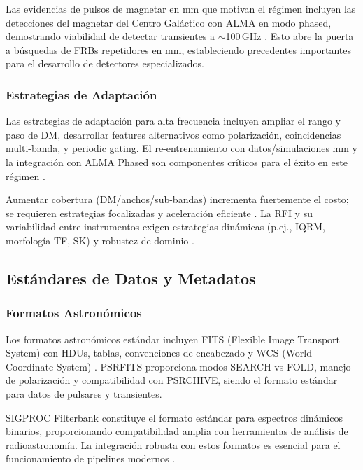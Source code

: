 Las evidencias de pulsos de magnetar en mm que motivan el régimen incluyen las detecciones del magnetar del Centro Galáctico con ALMA en modo phased, demostrando viabilidad de detectar transientes a $\sim$100\,GHz \citep{veracasanova2025}. Esto abre la puerta a búsquedas de FRBs repetidores en mm, estableciendo precedentes importantes para el desarrollo de detectores especializados.

\subsubsection{Estrategias de Adaptación}

Las estrategias de adaptación para alta frecuencia incluyen ampliar el rango y paso de DM, desarrollar features alternativos como polarización, coincidencias multi-banda, y periodic gating. El re-entrenamiento con datos/simulaciones mm y la integración con ALMA Phased son componentes críticos para el éxito en este régimen \citep{veracasanova2025}.

Aumentar cobertura (DM/anchos/sub-bandas) incrementa fuertemente el costo; se requieren estrategias focalizadas y aceleración eficiente \citep{zhang2024drafts,Zackay_2014_FDMT}. La RFI y su variabilidad entre instrumentos exigen estrategias dinámicas (p.ej., IQRM, morfología TF, SK) y robustez de dominio \citep{Morello_2021_IQRM,Offringa2010,Offringa2012}.

\subsection{Estándares de Datos y Metadatos}

\subsubsection{Formatos Astronómicos}

Los formatos astronómicos estándar incluyen FITS (Flexible Image Transport System) con HDUs, tablas, convenciones de encabezado y WCS (World Coordinate System) \citep{Hotan_2004_PSRFITS}. PSRFITS proporciona modos SEARCH vs FOLD, manejo de polarización y compatibilidad con PSRCHIVE, siendo el formato estándar para datos de pulsares y transientes.

SIGPROC Filterbank constituye el formato estándar para espectros dinámicos binarios, proporcionando compatibilidad amplia con herramientas de análisis de radioastronomía. La integración robusta con estos formatos es esencial para el funcionamiento de pipelines modernos \citep{Hotan_2004_PSRFITS}.

